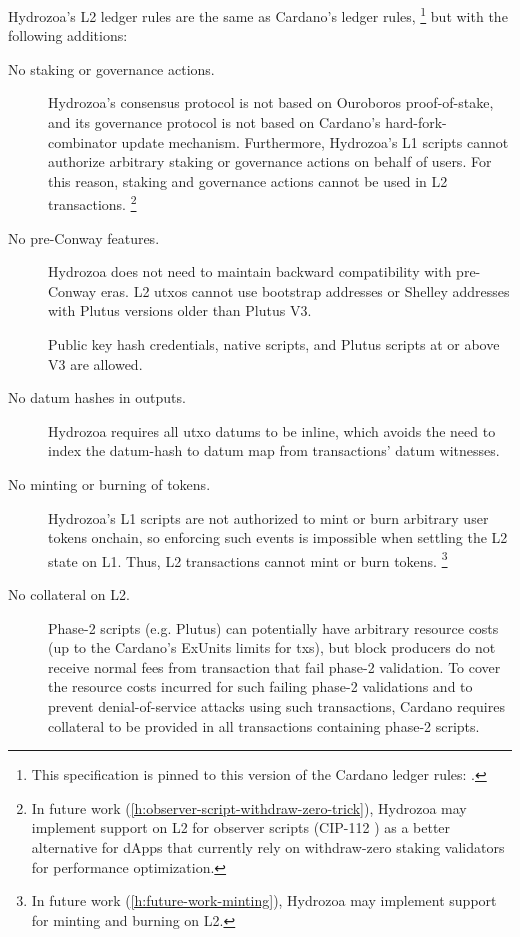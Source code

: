 \documentclass[../hydrozoa.tex]{subfiles}
\begin{document}
Hydrozoa's L2 ledger rules are the same as Cardano's ledger rules,%
\footnote{This specification is pinned to this version of the Cardano ledger rules: \citep{IntersectMBOCardanoLedgerV117402025}.}
but with the following additions:
\begin{description}
    \item[No staking or governance actions.]
      Hydrozoa's consensus protocol is not based on Ouroboros proof-of-stake, and its governance protocol is not based on Cardano's hard-fork-combinator update mechanism.
      Furthermore, Hydrozoa's L1 scripts cannot authorize arbitrary staking or governance actions on behalf of users.
      For this reason, staking and governance actions cannot be used in L2 transactions.%
      \footnote{In future work (\cref{h:observer-script-withdraw-zero-trick}), Hydrozoa may implement support on L2 for observer scripts (CIP-112 \citep{DiSarroCIP112ObserveScript2024}) as a better alternative for dApps that currently rely on withdraw-zero staking validators for performance optimization.}
    \item[No pre-Conway features.] Hydrozoa does not need to maintain backward compatibility with pre-Conway eras.
      L2 utxos cannot use bootstrap addresses or Shelley addresses with Plutus versions older than Plutus V3.

      Public key hash credentials, native scripts, and Plutus scripts at or above V3 are allowed.
    \item[No datum hashes in outputs.] Hydrozoa requires all utxo datums to be inline, which avoids the need to index the datum-hash to datum map from transactions' datum witnesses.
    \item[No minting or burning of tokens.]
      Hydrozoa's L1 scripts are not authorized to mint or burn arbitrary user tokens onchain, so enforcing such events is impossible when settling the L2 state on L1.
      Thus, L2 transactions cannot mint or burn tokens.%
      \footnote{In future work (\cref{h:future-work-minting}), Hydrozoa may implement support for minting and burning on L2.}
    \item[No collateral on L2.]
      Phase-2 scripts (e.g. Plutus) can potentially have arbitrary resource costs (up to the Cardano's ExUnits limits for txs), but block producers do not receive normal fees from transaction that fail phase-2 validation.
      To cover the resource costs incurred for such failing phase-2 validations and to prevent denial-of-service attacks using such transactions, Cardano requires collateral to be provided in all transactions containing phase-2 scripts.


\end{description}
\end{document}
